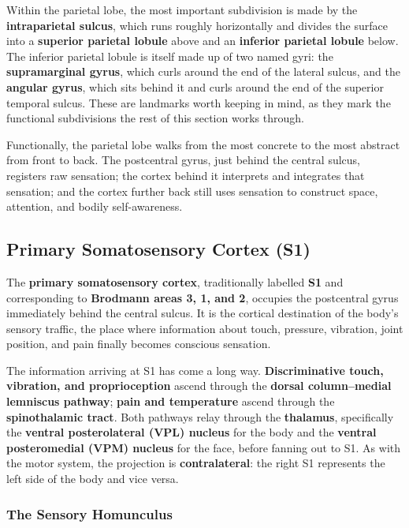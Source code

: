 \documentclass[11pt]{article}
\begin{document}
Within the parietal lobe, the most important subdivision is made by the \textbf{intraparietal sulcus}, which runs roughly horizontally and divides the surface into a \textbf{superior parietal lobule} above and an \textbf{inferior parietal lobule} below. The inferior parietal lobule is itself made up of two named gyri: the \textbf{supramarginal gyrus}, which curls around the end of the lateral sulcus, and the \textbf{angular gyrus}, which sits behind it and curls around the end of the superior temporal sulcus. These are landmarks worth keeping in mind, as they mark the functional subdivisions the rest of this section works through.

Functionally, the parietal lobe walks from the most concrete to the most abstract from front to back. The postcentral gyrus, just behind the central sulcus, registers raw sensation; the cortex behind it interprets and integrates that sensation; and the cortex further back still uses sensation to construct space, attention, and bodily self-awareness.

\subsection{Primary Somatosensory Cortex (S1)}

The \textbf{primary somatosensory cortex}, traditionally labelled \textbf{S1} and corresponding to \textbf{Brodmann areas 3, 1, and 2}, occupies the postcentral gyrus immediately behind the central sulcus. It is the cortical destination of the body's sensory traffic, the place where information about touch, pressure, vibration, joint position, and pain finally becomes conscious sensation.

The information arriving at S1 has come a long way. \textbf{Discriminative touch, vibration, and proprioception} ascend through the \textbf{dorsal column--medial lemniscus pathway}; \textbf{pain and temperature} ascend through the \textbf{spinothalamic tract}. Both pathways relay through the \textbf{thalamus}, specifically the \textbf{ventral posterolateral (VPL) nucleus} for the body and the \textbf{ventral posteromedial (VPM) nucleus} for the face, before fanning out to S1. As with the motor system, the projection is \textbf{contralateral}: the right S1 represents the left side of the body and vice versa.

\subsubsection{The Sensory Homunculus}
\end{document}
